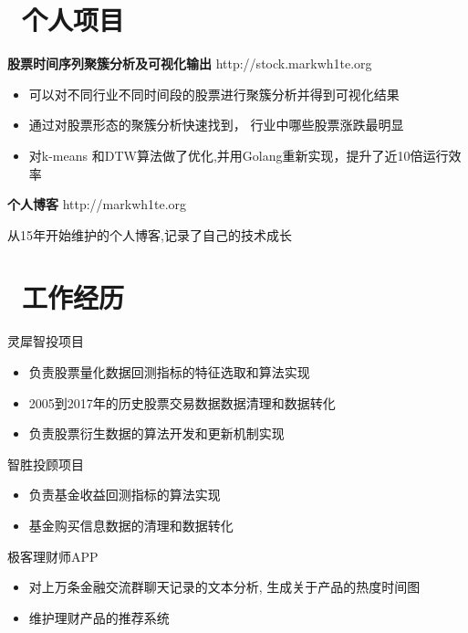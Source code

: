 \documentclass{resume}
\begin{document}



\section{\faTruck\ 个人项目}
\textbf{股票时间序列聚簇分析及可视化输出} http://stock.markwh1te.org
\begin{itemize}
  \item 可以对不同行业不同时间段的股票进行聚簇分析并得到可视化结果 
  \item 通过对股票形态的聚簇分析快速找到， 行业中哪些股票涨跌最明显
  \item 对k-means 和DTW算法做了优化,并用Golang重新实现，提升了近10倍运行效率
\end{itemize}
\textbf{个人博客} http://markwh1te.org

从15年开始维护的个人博客,记录了自己的技术成长

\section{\faUsers\ 工作经历}

灵犀智投项目
\begin{itemize}
  \item 负责股票量化数据回测指标的特征选取和算法实现
  \item 2005到2017年的历史股票交易数据数据清理和数据转化
  \item 负责股票衍生数据的算法开发和更新机制实现
\end{itemize}
智胜投顾项目
\begin{itemize}
  \item 负责基金收益回测指标的算法实现
  \item 基金购买信息数据的清理和数据转化
\end{itemize}


极客理财师APP 
\begin{itemize}
  \item  对上万条金融交流群聊天记录的文本分析, 生成关于产品的热度时间图 
  \item  维护理财产品的推荐系统
\end{itemize}
\end{document}
